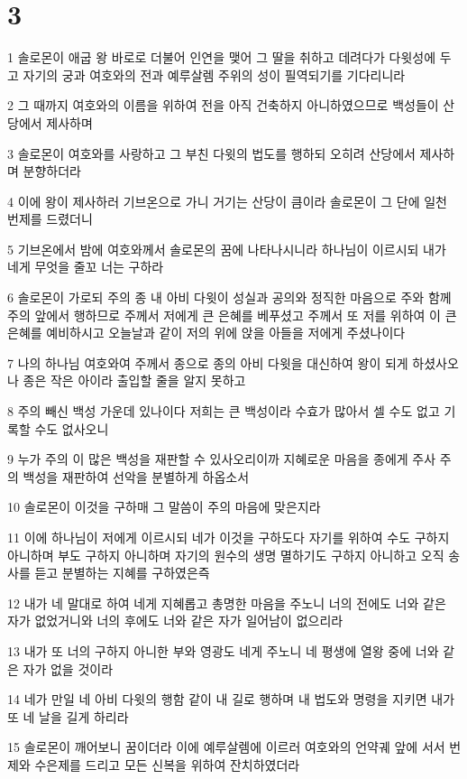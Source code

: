 \chapter{3}

\par 1 솔로몬이 애굽 왕 바로로 더불어 인연을 맺어 그 딸을 취하고 데려다가 다윗성에 두고 자기의 궁과 여호와의 전과 예루살렘 주위의 성이 필역되기를 기다리니라
\par 2 그 때까지 여호와의 이름을 위하여 전을 아직 건축하지 아니하였으므로 백성들이 산당에서 제사하며
\par 3 솔로몬이 여호와를 사랑하고 그 부친 다윗의 법도를 행하되 오히려 산당에서 제사하며 분향하더라
\par 4 이에 왕이 제사하러 기브온으로 가니 거기는 산당이 큼이라 솔로몬이 그 단에 일천 번제를 드렸더니
\par 5 기브온에서 밤에 여호와께서 솔로몬의 꿈에 나타나시니라 하나님이 이르시되 내가 네게 무엇을 줄꼬 너는 구하라
\par 6 솔로몬이 가로되 주의 종 내 아비 다윗이 성실과 공의와 정직한 마음으로 주와 함께 주의 앞에서 행하므로 주께서 저에게 큰 은혜를 베푸셨고 주께서 또 저를 위하여 이 큰 은혜를 예비하시고 오늘날과 같이 저의 위에 앉을 아들을 저에게 주셨나이다
\par 7 나의 하나님 여호와여 주께서 종으로 종의 아비 다윗을 대신하여 왕이 되게 하셨사오나 종은 작은 아이라 출입할 줄을 알지 못하고
\par 8 주의 빼신 백성 가운데 있나이다 저희는 큰 백성이라 수효가 많아서 셀 수도 없고 기록할 수도 없사오니
\par 9 누가 주의 이 많은 백성을 재판할 수 있사오리이까 지혜로운 마음을 종에게 주사 주의 백성을 재판하여 선악을 분별하게 하옵소서
\par 10 솔로몬이 이것을 구하매 그 말씀이 주의 마음에 맞은지라
\par 11 이에 하나님이 저에게 이르시되 네가 이것을 구하도다 자기를 위하여 수도 구하지 아니하며 부도 구하지 아니하며 자기의 원수의 생명 멸하기도 구하지 아니하고 오직 송사를 듣고 분별하는 지혜를 구하였은즉
\par 12 내가 네 말대로 하여 네게 지혜롭고 총명한 마음을 주노니 너의 전에도 너와 같은 자가 없었거니와 너의 후에도 너와 같은 자가 일어남이 없으리라
\par 13 내가 또 너의 구하지 아니한 부와 영광도 네게 주노니 네 평생에 열왕 중에 너와 같은 자가 없을 것이라
\par 14 네가 만일 네 아비 다윗의 행함 같이 내 길로 행하며 내 법도와 명령을 지키면 내가 또 네 날을 길게 하리라
\par 15 솔로몬이 깨어보니 꿈이더라 이에 예루살렘에 이르러 여호와의 언약궤 앞에 서서 번제와 수은제를 드리고 모든 신복을 위하여 잔치하였더라
